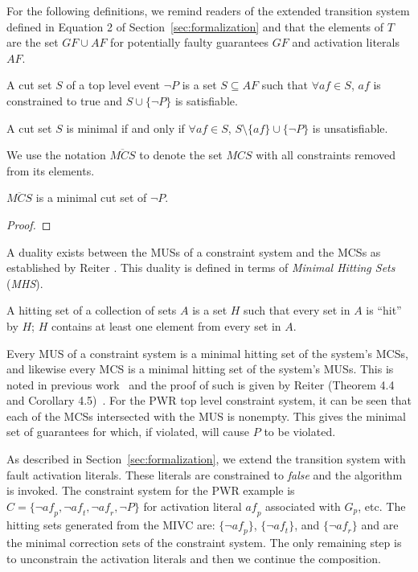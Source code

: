 For the following definitions, we remind readers of the extended transition system defined in Equation 2 of Section~\ref{sec:formalization} and that the elements of $T$ are the set $\mathit{GF} \cup \mathit{AF}$ for potentially faulty guarantees $\mathit{GF}$ and activation literals $\mathit{AF}$.

\begin{definition}
A cut set $S$ of a top level event $\neg P$ is a set $S \subseteq \mathit{AF}$ such that $\forall \mathit{af} \in S$, $\mathit{af}$ is constrained to true and $S \cup \{\neg P\}$ is satisfiable.
\end{definition}

\begin{definition}
A cut set $S$ is minimal if and only if $\forall \mathit{af} \in S$, $S \setminus \{\mathit{af}\} \cup \{\neg P\}$ is unsatisfiable.
\end{definition}

We use the notation $\overline{\mathit{MCS}}$ to denote the set $\mathit{MCS}$ with all constraints removed from its elements.

\begin{theorem}
$\overline{\mathit{MCS}}$ is a minimal cut set of $\neg P$.
\begin{proof}

\end{proof}
\end{theorem}

A duality exists between the MUSs of a constraint system and the MCSs as established by Reiter \cite{reiter1987theory}. This duality is defined in terms of \textit{Minimal Hitting Sets} (\textit{MHS}). 
\begin{definition}
A hitting set of a collection of sets $A$ is a set $H$ such that every set in $A$ is ``hit'' by $H$; $H$ contains at least one element from every set in $A$. 
\end{definition}
Every MUS of a constraint system is a minimal hitting set of the system's MCSs, and likewise every MCS is a minimal hitting set of the system's MUSs. This is noted in previous work~\cite{liffiton2016fast, de1987diagnosing} and the proof of such is given by Reiter (Theorem 4.4 and Corollary 4.5)~\cite{reiter1987theory}. For the PWR top level constraint system, it can be seen that each of the MCSs intersected with the MUS is nonempty. This gives the minimal set of guarantees for which, if violated, will cause $P$ to be violated. 

As described in Section~\ref{sec:formalization}, we extend the transition system with fault activation literals. These literals are constrained to {\em false} and the \aivcalg algorithm is invoked. The constraint system for the PWR example is $C = \{\neg\mathit{af}_p, \neg\mathit{af}_t, \neg\mathit{af}_r, \neg P\}$ for activation literal $\mathit{af}_p$ associated with $G_p$, etc. The hitting sets generated from the MIVC are: $\{\neg\mathit{af}_p\}$, $\{\neg\mathit{af}_t\}$, and $\{\neg\mathit{af}_r\}$ and are the minimal correction sets of the constraint system. The only remaining step is to unconstrain the activation literals and then we continue the composition.



